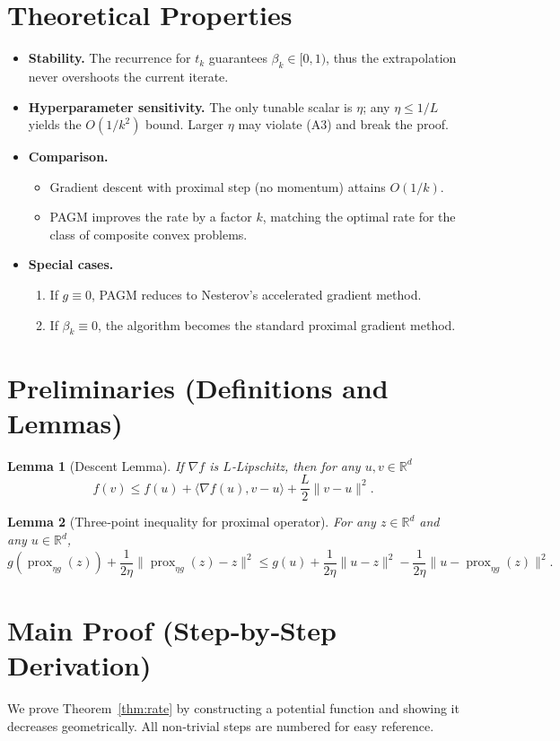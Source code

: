 \documentclass{article}
\newtheorem{lemma}{Lemma}
\newcommand{\prox}{\operatorname{prox}}
\newcommand{\R}{\mathbb{R}}
\begin{document}
\section*{Theoretical Properties}
\begin{itemize}
\item \textbf{Stability.} The recurrence for $t_k$ guarantees $\beta_k\in[0,1)$, thus the extrapolation never overshoots the current iterate.
\item \textbf{Hyperparameter sensitivity.} The only tunable scalar is $\eta$; any $\eta\le 1/L$ yields the $O(1/k^{2})$ bound. Larger $\eta$ may violate (A3) and break the proof.
\item \textbf{Comparison.}
    \begin{itemize}
        \item Gradient descent with proximal step (no momentum) attains $O(1/k)$.
        \item PAGM improves the rate by a factor $k$, matching the optimal rate for the class of composite convex problems.
    \end{itemize}
\item \textbf{Special cases.}
    \begin{enumerate}
        \item If $g\equiv0$, PAGM reduces to Nesterov’s accelerated gradient method.
        \item If $\beta_k\equiv0$, the algorithm becomes the standard proximal gradient method.
    \end{enumerate}
\end{itemize}

\section*{Preliminaries (Definitions and Lemmas)}
\begin{lemma}[Descent Lemma]\label{lem:descent}
If $\nabla f$ is $L$‑Lipschitz, then for any $u,v\in\R^{d}$
\[
f(v)\le f(u)+\langle\nabla f(u),v-u\rangle+\frac{L}{2}\|v-u\|^{2}. \tag{L1}
\]
\end{lemma}
\begin{lemma}[Three‑point inequality for proximal operator]\label{lem:prox}
For any $z\in\R^{d}$ and any $u\in\R^{d}$,
\[
g(\prox_{\eta g}(z))+\frac{1}{2\eta}\|\prox_{\eta g}(z)-z\|^{2}
\le g(u)+\frac{1}{2\eta}\|u-z\|^{2}
-\frac{1}{2\eta}\|u-\prox_{\eta g}(z)\|^{2}. \tag{L2}
\]
\end{lemma}

\section*{Main Proof (Step‑by‑Step Derivation)}
We prove Theorem~\ref{thm:rate} by constructing a potential function and showing it decreases geometrically.  
All non‑trivial steps are numbered for easy reference.
\end{document}
